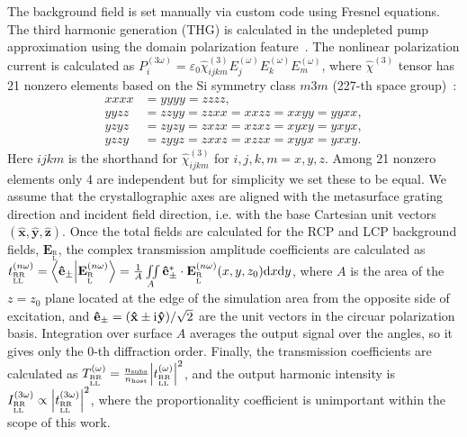 \documentclass[
    reprint,
    superscriptaddress,
    a4paper,
    amsmath,amssymb,
    prb,
]{revtex4-2}
\newcommand{\iu}{\mathrm{i}\mkern1mu}
\begin{document}
The background field is set manually via custom code using Fresnel equations.
The third harmonic generation (THG) is calculated in the undepleted pump approximation using the domain polarization feature~\cite{COMSOL_SHG_example}. The nonlinear polarization current is calculated as $P_{i}^{(3\omega)} = \varepsilon_0 \hat{\chi}^{(3)}_{ijkm} E_{j}^{(\omega)} E_{k}^{(\omega)} E_{m}^{(\omega)}$, 
where $\hat{\chi}^{(3)}$ tensor has 21 nonzero elements based on the Si symmetry class $m3m$ (227-th space group)~\cite[Table~1.5.4]{boyd2008nonlinear}:
\begin{align}
	xxxx &= yyyy = zzzz, \nonumber \\
	yyzz &= zzyy = zzxx = xxzz = xxyy = yyxx, \nonumber  \\
	yzyz &= zyzy = zxzx = xzxz = xyxy = yxyx, \nonumber  \\
	yzzy &= zyyz = zxxz = xzzx = xyyx = yxxy.
\end{align}
Here $ijkm$ is the shorthand for $\hat{\chi}^{(3)}_{ijkm}$ for $i,j,k,m = x,y,z$.
Among 21 nonzero elements only 4 are independent but for simplicity we set these to be equal.
We assume that the crystallographic axes are aligned with the
metasurface grating direction and incident field direction, i.e. with the base Cartesian unit vectors $(\mathbf{\hat{x}}, \mathbf{\hat{y}}, \mathbf{\hat{z}})$.
Once the total fields are calculated for the RCP and LCP background fields, $\mathbf{E}_{^{\text{R}} _{\text{L}}}$, the  complex transmission amplitude coefficients are calculated as $t^{(n\omega)}_{^{\text{RR}} _{\text{LL}} } = \braket{\mathbf{\hat{e}}_{\pm}}{\mathbf{E}_{^{\text{R}} _{\text{L}}}^{(n\omega)}} =  \frac{1}{A} \iint\limits_{A} \mathbf{\hat{e}}^{*}_{\pm} \cdot \mathbf{E}_{^{\text{R}} _{\text{L}}}^{(n\omega)} (x,y,z_0) \dd x \dd y$, where $A$ is the area of the $z=z_0$ plane located at the edge of the simulation area from the opposite side of excitation, and $\mathbf{\hat{e}}_{\pm} = (\mathbf{\hat{x}} \pm \iu \mathbf{\hat{y}} )/\sqrt{2}$ are the unit vectors in the circuar polarization basis.
Integration over surface $A$ averages the output signal over the angles, so it gives only the $0$-th diffraction order.
Finally, the transmission coefficients are calculated as $T^{(\omega)}_{^\text{RR} _{\text{LL}}} = \frac{n_{\text{subs}}}{n_{\text{host}}} \abs{t_{^\text{RR} _{\text{LL}}}^{(\omega)}}^2$, and the output harmonic intensity is $I_{^\text{RR} _{\text{LL}}}^{(3\omega)} \propto \abs{t_{^\text{RR} _{\text{LL}}}^{(3\omega)}}^2$, where the proportionality coefficient is unimportant within the scope of this work.
\end{document}
